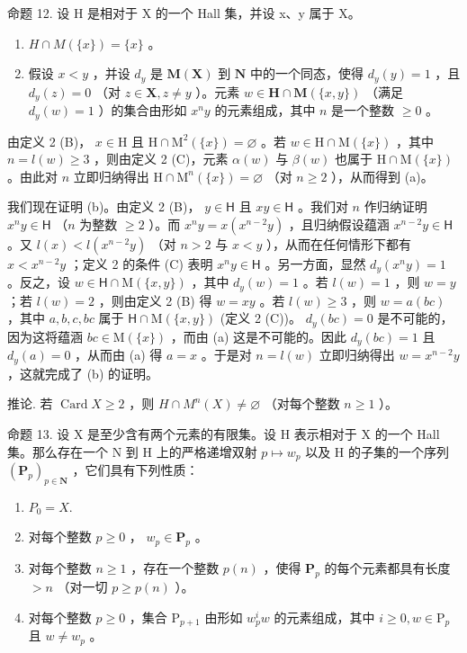 命题 12. 设 H 是相对于 X 的一个 Hall 集，并设 x、y 属于 X。

\begin{enumerate}
\def\labelenumi{(\alph{enumi})}
\item
  \(H \cap M(\{x\}) = \{x\}\) 。
\item
  假设 \(x < y\) ，并设 \(d_y\) 是 \(\mathbf{M}(\mathbf{X})\) 到 \(\mathbf{N}\) 中的一个同态，使得 \(d_y(y) = 1\) ，且 \(d_y(z) = 0\) （对 \(z \in \mathbf{X}, z \neq y\) ）。元素 \(w \in \mathbf{H} \cap \mathbf{M}(\{x, y\})\) （满足 \(d_y(w) = 1\) ）的集合由形如 \(x^n y\) 的元素组成，其中 \(n\) 是一个整数 \(\geqslant 0\) 。
\end{enumerate}

由定义 2 (B)， \(x \in \mathrm{H}\) 且 \(\mathrm{H} \cap \mathrm{M}^2(\{x\}) = \varnothing\) 。若 \(w \in \mathrm{H} \cap \mathrm{M}(\{x\})\) ，其中 \(n = l(w) \geqslant 3\) ，则由定义 2 (C)，元素 \(\alpha(w)\) 与 \(\beta(w)\) 也属于 \(\mathrm{H} \cap \mathrm{M}(\{x\})\) 。由此对 \(n\) 立即归纳得出 \(\mathrm{H} \cap \mathrm{M}^n(\{x\}) = \varnothing\) （对 \(n \geqslant 2\) ），从而得到 (a)。

我们现在证明 (b)。由定义 2 (B)， \(y \in \mathsf{H}\) 且 \(xy \in \mathsf{H}\) 。我们对 \(n\) 作归纳证明 \(x^n y \in \mathsf{H}\) （\(n\) 为整数 \(\geqslant 2\) ）。而 \(x^n y = x(x^{n-2}y)\) ，且归纳假设蕴涵 \(x^{n-2}y \in \mathsf{H}\) 。又 \(l(x) < l(x^{n-2}y)\) （对 \(n > 2\) 与 \(x < y\) ），从而在任何情形下都有 \(x < x^{n-2}y\) ；定义 2 的条件 (C) 表明 \(x^n y \in \mathsf{H}\) 。另一方面，显然 \(d_y(x^n y) = 1\) 。反之，设 \(w \in \mathsf{H} \cap \mathrm{M}(\{x, y\})\) ，其中 \(d_y(w) = 1\) 。若 \(l(w) = 1\) ，则 \(w = y\) ；若 \(l(w) = 2\) ，则由定义 2 (B) 得 \(w = xy\) 。若 \(l(w) \geqslant 3\) ，则 \(w = a(bc)\) ，其中 \(a, b, c, bc\) 属于 \(\mathsf{H} \cap \mathrm{M}(\{x, y\})\) (定义 2 (C))。 \(d_y(bc) = 0\) 是不可能的，因为这将蕴涵 \(bc \in \mathrm{M}(\{x\})\) ，而由 (a) 这是不可能的。因此 \(d_y(bc) = 1\) 且 \(d_y(a) = 0\) ，从而由 (a) 得 \(a = x\) 。于是对 \(n = l(w)\) 立即归纳得出 \(w = x^{n-2}y\) ，这就完成了 (b) 的证明。

推论. 若 \(\operatorname{Card} X \geqslant 2\) ，则 \(H \cap M^n(X) \neq \varnothing\) （对每个整数 \(n \geqslant 1\) ）。

命题 13. 设 X 是至少含有两个元素的有限集。设 H 表示相对于 X 的一个 Hall 集。那么存在一个 N 到 H 上的严格递增双射 \(p \mapsto w_p\) 以及 H 的子集的一个序列 \((\mathbf{P}_p)_{p \in \mathbf{N}}\) ，它们具有下列性质：

\begin{enumerate}
\def\labelenumi{(\alph{enumi})}
\item
  \(P_{0} = X.\)
\item
  对每个整数 \(p \geqslant 0\) ， \(w_{p} \in \mathbf{P}_{p}\) 。
\item
  对每个整数 \(n \geqslant 1\) ，存在一个整数 \(p(n)\) ，使得 \(\mathbf{P}_p\) 的每个元素都具有长度 \(> n\) （对一切 \(p \geqslant p(n)\) ）。
\item
  对每个整数 \(p \geqslant 0\) ，集合 \(\mathrm{P}_{p+1}\) 由形如 \(w_p^i w\) 的元素组成，其中 \(i \geqslant 0, w \in \mathrm{P}_p\) 且 \(w \neq w_p\) 。
\end{enumerate}

